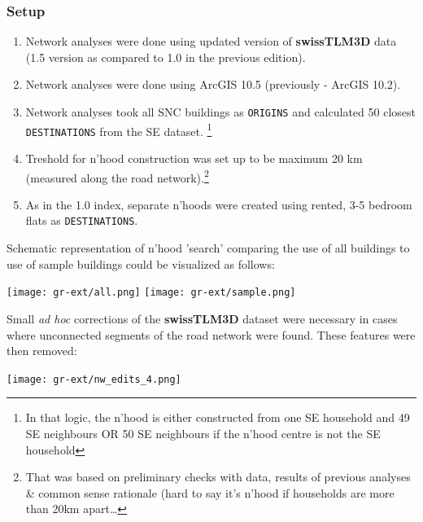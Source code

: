 \documentclass[a4paper, notitlepage, fleqn]{article} %
\begin{document}
\subsubsection{Setup}

\begin{enumerate}

	\item Network analyses were done using updated version of \textbf{swissTLM3D} data 
		(1.5 version as compared to 1.0 in the previous edition).
	
	\item Network analyses were done using ArcGIS 10.5 (previously - ArcGIS 10.2).
	
	\item Network analyses took all SNC buildings as \texttt{ORIGINS} and calculated 
		50 closest \texttt{DESTINATIONS} from the SE dataset.
		\footnote{In that logic, the n'hood is either constructed from one SE household and 49 SE neighbours 
		OR 50 SE neighbours if the n'hood centre is not the SE household}		
	
	\item Treshold for n'hood construction was set up to be maximum 20 km (measured along the road network).\footnote{That was based 
		on preliminary checks with data, results of previous analyses \& common sense rationale (hard to say it's n'hood if households are more than 20km apart\ldots}
	
	\item As in the 1.0 index, separate n'hoods were created using rented, 3-5 bedroom flats as \texttt{DESTINATIONS}. 

\end{enumerate}

Schematic representation of n'hood 'search' comparing the use of all buildings to use of sample buildings could be visualized as follows: 

\begin{center}
\texttt{[image: gr-ext/all.png]}
\texttt{[image: gr-ext/sample.png]} 
\end{center}

Small \textit{ad hoc} corrections of the \textbf{swissTLM3D} dataset were necessary in cases where unconnected segments of the road network were found. These features were then removed: 

\begin{center}
\texttt{[image: gr-ext/nw\_edits\_4.png]}
\end{center}
\end{document}
